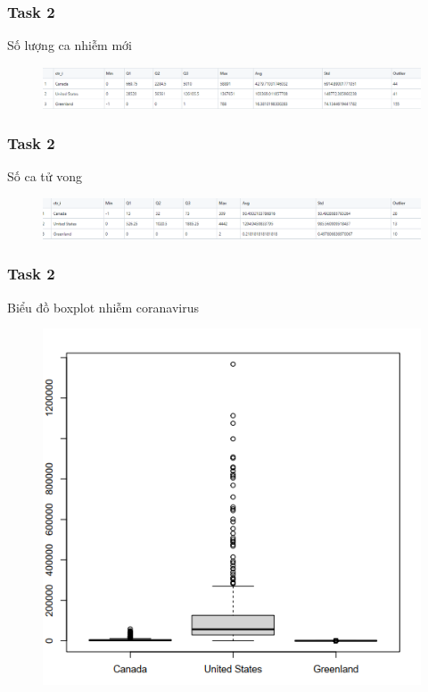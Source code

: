 \documentclass[english,10pt,table]{beamer}
\begin{document}
\frame
{
    \frametitle{Task 2}
    \begin{block}{Số lượng ca nhiễm mới}
    \begin{figure}
        \centering
        \includegraphics[scale=0.32]{images/2.1.png}
    \end{figure}
    \end{block}
}
\frame
{
    \frametitle{Task 2}
    \begin{block}{Số ca tử vong}
    \begin{figure}
        \centering
        \includegraphics[scale=0.32]{images/2.2.png}
    \end{figure}
    \end{block}
}
\frame
{
    \frametitle{Task 2}
    \begin{block}{Biểu đồ boxplot nhiễm coranavirus}
    \begin{figure}[H]
		\centering
		\includegraphics[scale=0.6]{images/2.3.png}
	\end{figure}
    \end{block}
}
\end{document}
